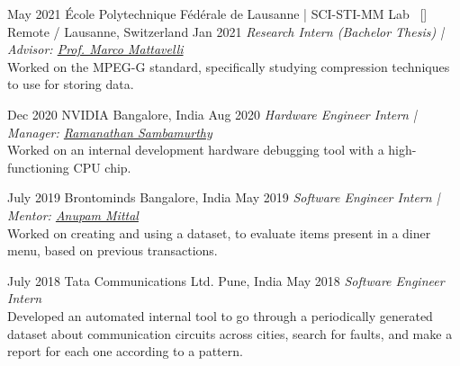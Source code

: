 \begin{experiences}
\researchexperience
    {May 2021}
    {École Polytechnique Fédérale de Lausanne | SCI-STI-MM Lab{\normalfont  ~ [\href{https://www.epfl.ch/labs/gramm/}{\small{\websiteSymbol}}]}}
    {Remote / Lausanne, Switzerland} {}
    {Jan 2021}
    {\textit{Research Intern (Bachelor Thesis) | Advisor:  \href{https://people.epfl.ch/marco.mattavelli?lang=en}{Prof. Marco Mattavelli}}\\
    Worked on the MPEG-G standard, specifically studying compression techniques to use for storing data.
    }
\emptySeparator

\researchexperience
    {Dec 2020}
    {NVIDIA}
    {Bangalore, India} {}
    {Aug 2020}
    {\textit{Hardware Engineer Intern | Manager:  \href{https://www.linkedin.com/in/ramanathan-sambamurthy-4540b9168}{Ramanathan Sambamurthy}}\\
    Worked on an internal development hardware debugging tool with a high-functioning CPU chip.
    }
\emptySeparator

\researchexperience
    {July 2019}
    {Brontominds}
    {Bangalore, India} {}
    {May 2019}
    {\textit{Software Engineer Intern | Mentor:  \href{https://in.linkedin.com/in/anupammittal}{Anupam Mittal}}\\
    Worked on creating and using a dataset, to evaluate items present in a diner menu, based on previous transactions.
    }
\emptySeparator

\researchexperience
    {July 2018}
    {Tata Communications Ltd.}
    {Pune, India} {}
    {May 2018}
    {\textit{Software Engineer Intern}\\
    Developed an automated internal tool to go through a periodically generated dataset about communication circuits across cities, search for faults, and make a report for each one according to a pattern.
    }
  
\end{experiences}
\vspace{-4mm}
